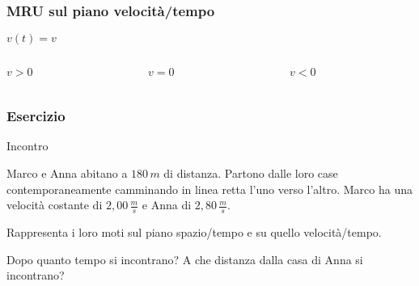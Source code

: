 \documentclass[]{beamer}
\theoremstyle{plain}
\begin{document}
\begin{frame}
\frametitle{MRU sul piano velocità/tempo}
\begin{center}
\colorbox{blue!30}{$ v(t) = v  $}
\end{center}
\begin{columns}
\begin{column}{0.3\textwidth}
\begin{figure}\centering
{}
\end{figure}
\begin{center}
$ v>0 $
\end{center}
\end{column}
\begin{column}{0.3\textwidth}
\begin{figure}\centering
{}
\end{figure}
\begin{center}
$ v=0 $
\end{center}
\end{column}
\begin{column}{0.3\textwidth}
\begin{figure}\centering
{}
\end{figure}
\begin{center}
$ v<0 $
\end{center}
\end{column}
\end{columns}
\end{frame}


\begin{frame}
\frametitle{Esercizio}
\begin{exampleblock}{Incontro}
  \small{Marco e Anna abitano a $ 180 \, m $ di distanza. Partono dalle loro case contemporaneamente camminando in linea retta l'uno verso l'altro. Marco ha una velocità costante di $ 2,00 \, \frac{m}{s} $ e Anna di $ 2,80 \, \frac{m}{s} $.

Rappresenta i loro moti sul piano spazio/tempo e su quello velocità/tempo.

Dopo quanto tempo si incontrano? A che distanza dalla casa di Anna si incontrano?}
\end{exampleblock}
\end{frame}
\end{document}
